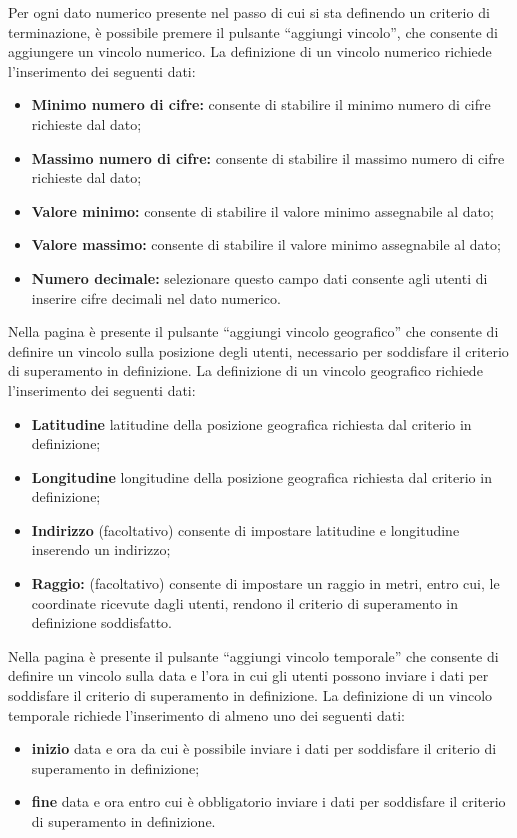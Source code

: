Per ogni dato numerico presente nel passo di cui si sta definendo un criterio di terminazione, è possibile premere il pulsante ``aggiungi vincolo'', che consente di aggiungere un vincolo numerico.
La definizione di un vincolo numerico richiede l'inserimento dei seguenti dati:
\begin{itemize}
\item \textbf{Minimo numero di cifre:} consente di stabilire il minimo numero di cifre richieste dal dato;
\item \textbf{Massimo numero di cifre:} consente di stabilire il massimo numero di cifre richieste dal dato;
\item \textbf{Valore minimo:} consente di stabilire il valore minimo assegnabile al dato;
\item \textbf{Valore massimo:} consente di stabilire il valore minimo assegnabile al dato;
\item \textbf{Numero decimale:} selezionare questo campo dati consente agli utenti di inserire cifre decimali nel dato numerico.
\end{itemize}

Nella pagina è presente il pulsante ``aggiungi vincolo geografico'' che consente di definire un vincolo sulla posizione degli utenti, necessario per soddisfare il criterio di superamento in definizione.
La definizione di un vincolo geografico richiede l'inserimento dei seguenti dati:
\begin{itemize}
\item \textbf{Latitudine} latitudine della posizione geografica richiesta dal criterio in definizione;
\item \textbf{Longitudine} longitudine della posizione geografica richiesta dal criterio in definizione;
\item \textbf{Indirizzo} (facoltativo) consente di impostare latitudine e longitudine inserendo un indirizzo;
\item \textbf{Raggio:} (facoltativo) consente di impostare un raggio in metri, entro cui, le coordinate ricevute dagli utenti, rendono il criterio di superamento in definizione soddisfatto.
\end{itemize}

Nella pagina è presente il pulsante ``aggiungi vincolo temporale'' che consente di definire un vincolo sulla data e l'ora in cui gli utenti possono inviare i dati per soddisfare il criterio di superamento in definizione.
La definizione di un vincolo temporale richiede l'inserimento di almeno uno dei seguenti dati:
\begin{itemize}
\item \textbf{inizio} data e ora da cui è possibile inviare i dati per soddisfare il criterio di superamento in definizione;
\item \textbf{fine} data e ora entro cui è obbligatorio inviare i dati per soddisfare il criterio di superamento in definizione.
\end{itemize}

